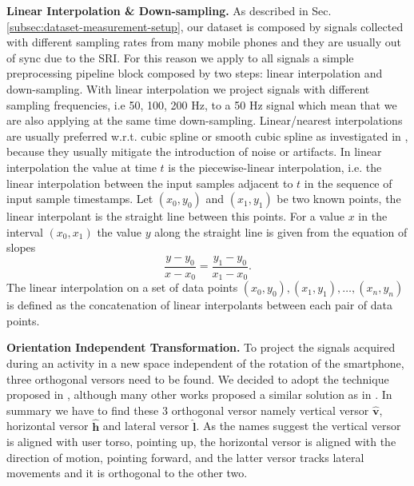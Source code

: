 \textbf{Linear Interpolation \& Down-sampling.} As described in
Sec. \ref{subsec:dataset-measurement-setup}, our dataset is composed
by signals collected with different sampling rates from many mobile
phones and they are usually out of sync due to the SRI. For this
reason we apply to all signals a simple preprocessing pipeline block
composed by two steps: linear interpolation and down-sampling. With
linear interpolation we project signals with different sampling
frequencies, i.e 50, 100, 200 Hz, to a 50 Hz signal which mean that
we are also applying at the same time down-sampling. Linear/nearest
interpolations are usually preferred w.r.t. cubic spline or smooth
cubic spline as investigated in \cite{stisen2015smart}, because they
usually mitigate the introduction of noise or artifacts. In linear
interpolation the value at time $t$ is the piecewise-linear
interpolation, i.e. the linear interpolation between the input samples
adjacent to $t$ in the sequence of input sample timestamps. Let $(x_0,
y_0)$ and $(x_1, y_1)$ be two known points, the linear interpolant is
the straight line between this points. For a value $x$ in the interval
$(x_0, x_1)$ the value $y$ along the straight line is given from the
equation of slopes
\begin{equation}
  \label{eq:linear-interpolation}
  \frac{y - y_0}{x - x_0} = \frac{y_1 - y_0}{x_1 - x_0}.
\end{equation}
The linear interpolation on a set of data points $(x_0, y_0), (x_1, y_1), \ldots, (x_n, y_n)$ is defined as the concatenation of linear interpolants between each pair of data points.


\vspace{1em}
\textbf{Orientation Independent Transformation.}
To project the signals acquired during an activity in a new space independent of the rotation of the smartphone, three orthogonal versors need to be found. We decided to adopt the technique proposed in \cite{gadaleta2018idnet}, although many other works proposed a similar solution as in \cite{kunze2009way, henpraserttae2011accurate}. In summary we have to find these 3 orthogonal versor namely vertical versor $\boldsymbol{\hat{v}}$, horizontal versor $\boldsymbol{\hat{h}}$ and lateral versor $\boldsymbol{\hat{l}}$. As the names suggest the vertical versor is aligned with user torso, pointing up, the horizontal versor is aligned with the direction of motion, pointing forward, and the latter versor tracks lateral movements and it is orthogonal to the other two.

